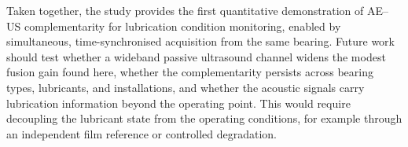 Taken together, the study provides the first quantitative demonstration of
AE--US complementarity for lubrication condition monitoring, enabled by
simultaneous, time-synchronised acquisition from the same bearing. Future work
should test whether a wideband passive ultrasound channel widens the modest
fusion gain found here, whether the complementarity persists across bearing
types, lubricants, and installations, and whether the acoustic signals carry
lubrication information beyond the operating point. This would require decoupling
the lubricant state from the operating conditions, for example through an
independent film reference or controlled degradation.